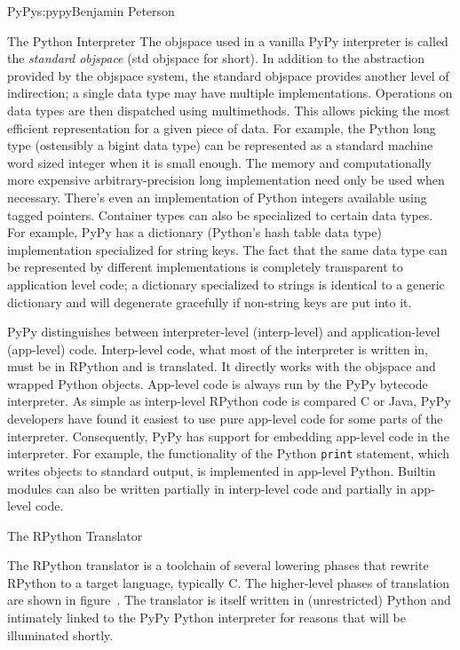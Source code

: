\begin{aosachapter}{PyPy}{s:pypy}{Benjamin Peterson}
\begin{aosasect1}{The Python Interpreter}
The objspace used in a vanilla PyPy interpreter is called the \emph{standard
  objspace} (std objspace for short). In addition to the abstraction provided by
the objspace system, the standard objspace provides another level of
indirection; a single data type may have multiple implementations. Operations on
data types are then dispatched using multimethods. This allows picking the most
efficient representation for a given piece of data. For example, the Python long
type (ostensibly a bigint data type) can be represented as a standard machine
word sized integer when it is small enough. The memory and computationally more
expensive arbitrary-precision long implementation need only be used when
necessary. There's even an implementation of Python integers available using
tagged pointers. Container types can also be specialized to certain data
types. For example, PyPy has a dictionary (Python's hash table data type)
implementation specialized for string keys. The fact that the same data type
can be represented by different implementations is completely transparent to
application level code; a dictionary specialized to strings is identical to a
generic dictionary and will degenerate gracefully if non-string keys are put
into it.

PyPy distinguishes between interpreter-level (interp-level) and
application-level (app-level) code. Interp-level code, what most of the
interpreter is written in, must be in RPython and is translated. It directly
works with the objspace and wrapped Python objects. App-level code is always run
by the PyPy bytecode interpreter. As simple as interp-level RPython code is
compared C or Java, PyPy developers have found it easiest to use pure app-level
code for some parts of the interpreter. Consequently, PyPy has support for
embedding app-level code in the interpreter. For example, the functionality of
the Python \verb+print+ statement, which writes objects to standard output, is
implemented in app-level Python. Builtin modules can also be written partially
in interp-level code and partially in app-level code.

\end{aosasect1}

\begin{aosasect1}{The RPython Translator}
\label{sec:translator}

The RPython translator is a toolchain of several lowering phases that rewrite
RPython to a target language, typically C. The higher-level phases of
translation are shown in figure~. The translator is
itself written in (unrestricted) Python and intimately linked to the PyPy Python
interpreter for reasons that will be illuminated shortly.


\end{aosasect1}
\end{aosachapter}
